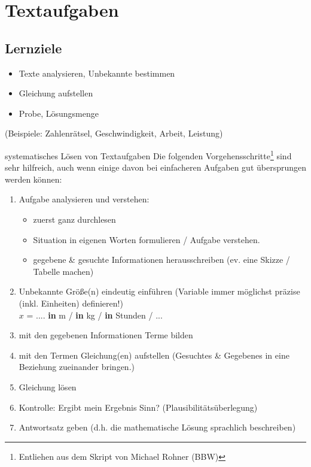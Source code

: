 \section{Textaufgaben}

\subsection*{Lernziele}

\begin{itemize}
\item Texte analysieren, Unbekannte bestimmen
\item Gleichung aufstellen
\item Probe, Lösungsmenge
\end{itemize}
(Beispiele: Zahlenrätsel, Geschwindigkeit, Arbeit, Leistung)

\newpage

\begin{rezept}{systematisches Lösen von Textaufgaben}{}
Die folgenden Vorgehensschritte\footnote{Entliehen aus dem Skript von Michael
  Rohner (BBW)} sind sehr hilfreich, auch wenn einige davon bei
  einfacheren Aufgaben gut übersprungen werden können:

\begin{enumerate}\label{textaufgaben_verfahren_in_sieben_schritten}
\item Aufgabe analysieren und verstehen:
  \begin{itemize}
  \item zuerst ganz durchlesen
  \item Situation in eigenen Worten formulieren / Aufgabe verstehen.
  \item gegebene \& gesuchte Informationen herausschreiben
    (ev. eine Skizze / Tabelle machen)
  \end {itemize}
  
\item Unbekannte Größe(n) eindeutig einführen
  (Variable immer möglichst präzise (inkl. Einheiten) definieren!)
  \\
  $x$ = .... \textbf{in} m / \textbf{in} kg / \textbf{in} Stunden  / ...
\item mit den gegebenen Informationen Terme bilden
  
\item mit den Termen Gleichung(en) aufstellen
  (Gesuchtes \& Gegebenes in eine Beziehung zueinander bringen.)

\item Gleichung lösen

\item Kontrolle: Ergibt mein Ergebnis Sinn? (Plausibilitätsüberlegung)

\item  Antwortsatz geben (d.h. die mathematische Lösung sprachlich
    beschreiben)
    
\end{enumerate}    
\end{rezept}

